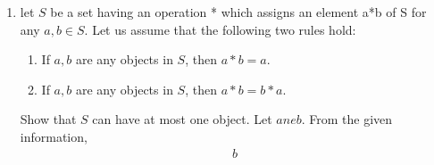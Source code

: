
\renewcommand{\theequation}{\theenumi}
\begin{enumerate}[label=\arabic*.,ref=\thesubsection.\theenumi]


	\item let $S$ be a set having an operation * which assigns an element a*b of S for any $a,b \in S$. Let us assume that the following two rules hold:
		\begin{enumerate}
			\item If $a,b$ are any objects in $S$, then $a*b = a$.
			\item If $a,b$ are any objects in $S$, then $a*b = b*a$.
		\end{enumerate}
		Show that $S$ can have at most one object.
		\solution Let $a ne b$.  From the given information, 
		\begin{align}
			b
		\end{align}
\end{enumerate}
